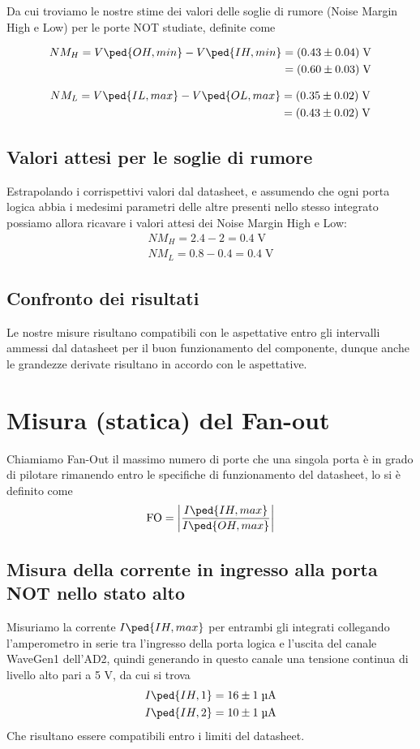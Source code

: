 \documentclass[10pt, a4paper, italian]{article}
\begin{document}
Da cui troviamo le nostre stime dei valori delle soglie di rumore (Noise
Margin High e Low) per le porte NOT studiate, definite come
\begin{multicols}{2}
\begin{align*}
NM_H = V\ped{OH, min} - V\ped{IH, min} &= (0.43 \pm 0.04) \; \si{\V} \\
    &= (0.60 \pm 0.03) \; \si{\V}
\end{align*}

\begin{align*}    
NM_L = V\ped{IL, max} - V\ped{OL, max} &= (0.35 \pm 0.02) \; \si{\V} \\
    &= (0.43 \pm 0.02) \; \si{\V}
\end{align*}
\end{multicols}

\subsection{Valori attesi per le soglie di rumore}
Estrapolando i corrispettivi valori dal datasheet, e assumendo che ogni porta
logica abbia i medesimi parametri delle altre presenti nello stesso integrato
possiamo allora ricavare i valori attesi dei Noise Margin High e Low:
\begin{align*}
NM_H = 2.4 - 2 = 0.4 \; \si{\V} \\
NM_L = 0.8 - 0.4 = 0.4 \; \si{\V}
\end{align*}

\subsection{Confronto dei risultati}
Le nostre misure risultano compatibili con le aspettative entro gli intervalli
ammessi dal datasheet per il buon funzionamento del componente, dunque anche
le grandezze derivate risultano in accordo con le aspettative.

\section{Misura (statica) del Fan-out}
Chiamiamo Fan-Out il massimo numero di porte che una singola porta è in grado
di pilotare rimanendo entro le specifiche di funzionamento del datasheet, lo
si è definito come
\[
\text{FO}= \abs{\frac{I\ped{IH, max}}{I\ped{OH, max}}}
\]

\subsection{Misura della corrente in ingresso alla porta NOT nello stato alto}
Misuriamo la corrente $I\ped{IH, max}$ per entrambi gli integrati collegando
l'amperometro in serie tra l'ingresso della porta logica e l'uscita del
canale WaveGen1 dell'AD2, quindi generando in questo canale una tensione
continua di livello alto pari a 5 V, da cui si trova
\begin{align*}
    I\ped{IH, 1} &= 16 \pm 1 \; \si{\micro\A} \\
    I\ped{IH, 2} &= 10 \pm 1 \; \si{\micro\A} \\   
\end{align*}
Che risultano essere compatibili entro i limiti del datasheet.
\end{document}
